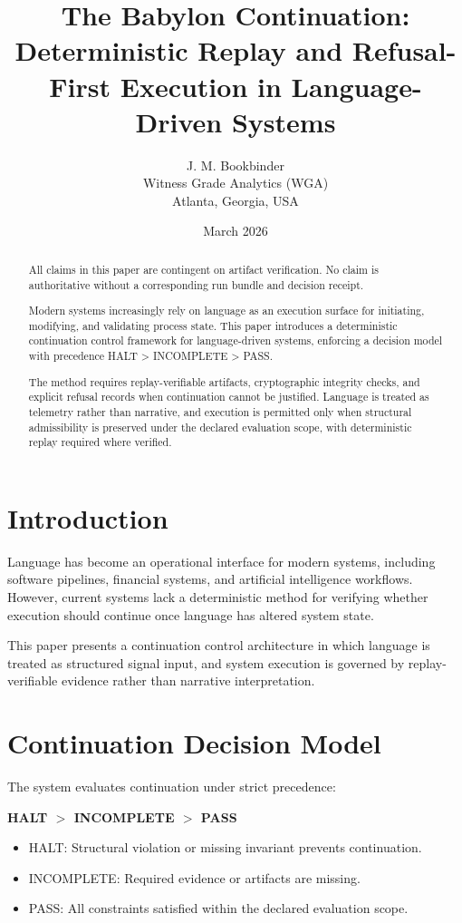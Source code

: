 \documentclass[11pt]{article}
\title{The Babylon Continuation: Deterministic Replay and Refusal-First Execution in Language-Driven Systems}
\author{J. M. Bookbinder\\
Witness Grade Analytics (WGA)\\
Atlanta, Georgia, USA}
\date{March 2026}
\begin{document}
\maketitle

\begin{abstract}
All claims in this paper are contingent on artifact verification. No claim is authoritative without a corresponding run bundle and decision receipt.

Modern systems increasingly rely on language as an execution surface for initiating, modifying, and validating process state. This paper introduces a deterministic continuation control framework for language-driven systems, enforcing a decision model with precedence HALT > INCOMPLETE > PASS.

The method requires replay-verifiable artifacts, cryptographic integrity checks, and explicit refusal records when continuation cannot be justified. Language is treated as telemetry rather than narrative, and execution is permitted only when structural admissibility is preserved under the declared evaluation scope, with deterministic replay required where verified.
\end{abstract}

\section{Introduction}

Language has become an operational interface for modern systems, including software pipelines, financial systems, and artificial intelligence workflows. However, current systems lack a deterministic method for verifying whether execution should continue once language has altered system state.

This paper presents a continuation control architecture in which language is treated as structured signal input, and system execution is governed by replay-verifiable evidence rather than narrative interpretation.

\section{Continuation Decision Model}

The system evaluates continuation under strict precedence:

\begin{center}
\textbf{HALT $>$ INCOMPLETE $>$ PASS}
\end{center}

\begin{itemize}
\item HALT: Structural violation or missing invariant prevents continuation.
\item INCOMPLETE: Required evidence or artifacts are missing.
\item PASS: All constraints satisfied within the declared evaluation scope.
\end{itemize}
\end{document}
